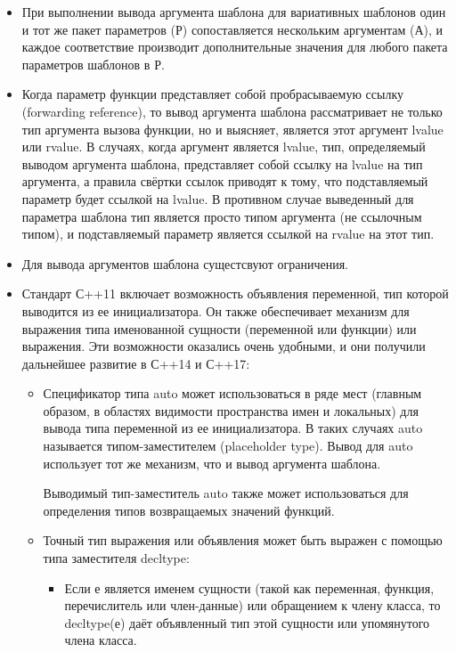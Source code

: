 \documentclass[a4paper,12pt]{article}	%
\begin{document}
\begin{itemize}
		\item При выполнении вывода аргумента шаблона для вариативных шаблонов один и тот же пакет параметров (Р) сопоставляется нескольким аргументам (А), и каждое соответствие производит дополнительные значения для любого пакета параметров шаблонов в Р.
	
		\item Когда параметр функции представляет собой пробрасываемую ссылку (forwarding reference), то вывод аргумента шаблона рассматривает не только тип аргумента вызова функции, но и выясняет, является этот аргумент lvalue или rvalue. В случаях, когда аргумент является lvalue, тип, определяемый выводом аргумента шаблона, представляет собой ссылку на lvalue на тип аргумента, а правила свёртки ссылок приводят к тому, что подставляемый параметр будет ссылкой на lvalue. В противном случае выведенный для параметра шаблона тип является просто типом аргумента (не ссылочным типом), и подставляемый параметр является ссылкой на rvalue на этот тип.
	
		\item Для вывода аргументов шаблона сущестсвуют ограничения.
	
		\item Стандарт С++11 включает возможность объявления переменной, тип которой выводится из ее инициализатора. Он также обеспечивает механизм для выражения типа именованной сущности (переменной или функции) или выражения. Эти возможности оказались очень удобными, и они получили дальнейшее развитие в С++14 и С++17:
	
		\begin{itemize}
	
			\item Спецификатор типа auto может использоваться в ряде мест (главным образом, в областях видимости пространства имен и локальных) для вывода типа переменной из ее инициализатора. В таких случаях auto называется типом-заместителем (placeholder type). Вывод для auto использует тот же механизм, что и вывод аргумента шаблона.
		
			Выводимый тип-заместитель auto также может использоваться для определения типов возвращаемых значений функций.
		
			\item Точный тип выражения или объявления может быть выражен с помощью типа заместителя decltype:
		
			\begin{itemize}
		
				\item Если е является именем сущности (такой как переменная, функция, перечислитель или член-данные) или обращением к члену класса, то decltype(е) даёт объявленный тип этой сущности или упомянутого члена класса.
			

\end{itemize}
\end{itemize}
\end{itemize}
\end{document}
